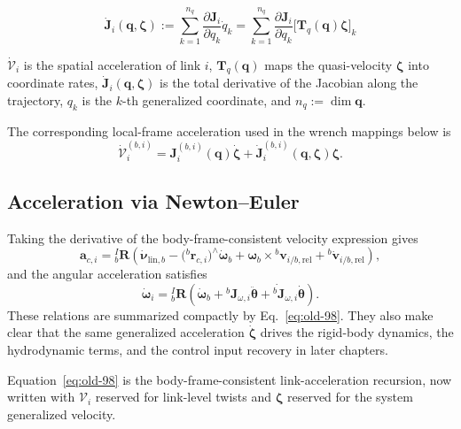 \documentclass[12pt,a4paper]{report}
\newcommand{\newsymbols}[1]{\par\noindent{}#1\par\vspace{0.35em}}
\newcommand{\formulaannotation}[1]{\par\noindent{}#1\par\vspace{0.35em}}
\begin{document}
\begin{equation}
\dot{\mathbf{J}}_i(\mathbf{q},\boldsymbol{\zeta})
:=
\sum_{k=1}^{n_q} \frac{\partial \mathbf{J}_i}{\partial q_k} \dot{q}_k
=
\sum_{k=1}^{n_q} \frac{\partial \mathbf{J}_i}{\partial q_k} \bigl[\mathbf{T}_{q}(\mathbf{q})\boldsymbol{\zeta}\bigr]_k
\label{eq:old-99}
\end{equation}
\newsymbols{$\dot{\mathcal{V}}_i$ is the spatial acceleration of link $i$, $\mathbf{T}_{q}(\mathbf{q})$ maps the quasi-velocity $\boldsymbol{\zeta}$ into coordinate rates, $\dot{\mathbf{J}}_i(\mathbf{q},\boldsymbol{\zeta})$ is the total derivative of the Jacobian along the trajectory, $q_k$ is the $k$-th generalized coordinate, and $n_q := \dim \mathbf{q}$.}

The corresponding local-frame acceleration used in the wrench mappings below is
\begin{equation}
\dot{\mathcal{V}}_i^{(b,i)}
=
\mathbf{J}_i^{(b,i)}(\mathbf{q})\dot{\boldsymbol{\zeta}}
+
\dot{\mathbf{J}}_i^{(b,i)}(\mathbf{q},\boldsymbol{\zeta})\boldsymbol{\zeta}.
\end{equation}

\subsection{Acceleration via Newton--Euler}

Taking the derivative of the body-frame-consistent velocity expression gives
\begin{equation}
\mathbf{a}_{c,i}
=
{}_{b}^{I}\mathbf{R}
\left(
\dot{\boldsymbol{\nu}}_{\mathrm{lin},b}
- \bigl({}^{b}\mathbf{r}_{c,i}\bigr)^\wedge \dot{\boldsymbol{\omega}}_b
+ \boldsymbol{\omega}_b \times {}^{b}\mathbf{v}_{i/b,\mathrm{rel}}
+ {}^{b}\dot{\mathbf{v}}_{i/b,\mathrm{rel}}
\right),
\end{equation}
and the angular acceleration satisfies
\begin{equation}
\dot{\boldsymbol{\omega}}_i
=
{}_{b}^{I}\mathbf{R}
\left(
\dot{\boldsymbol{\omega}}_b
+ {}^{b}\mathbf{J}_{\omega,i}\ddot{\boldsymbol{\theta}}
+ \dot{{}^{b}\mathbf{J}}_{\omega,i}\dot{\boldsymbol{\theta}}
\right).
\end{equation}
These relations are summarized compactly by Eq.~\eqref{eq:old-98}. They also make clear that the same generalized acceleration $\dot{\boldsymbol{\zeta}}$ drives the rigid-body dynamics, the hydrodynamic terms, and the control input recovery in later chapters.
\formulaannotation{Equation~\eqref{eq:old-98} is the body-frame-consistent link-acceleration recursion, now written with $\mathcal{V}_i$ reserved for link-level twists and $\boldsymbol{\zeta}$ reserved for the system generalized velocity.}
\end{document}
